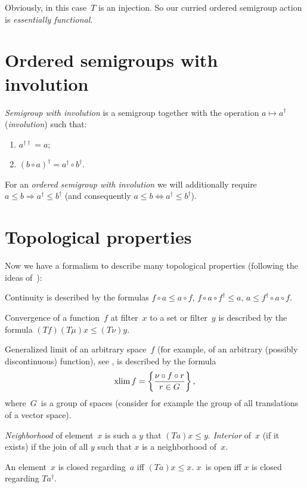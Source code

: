 Obviously, in this case~$T$ is an injection. So our curried ordered semigroup action is \emph{essentially functional}.

\section{Ordered semigroups with involution}

\begin{defn}
\emph{Semigroup with involution} is a semigroup together with the operation $a\mapsto a^{\dagger}$ (\emph{involution}) such that:
\begin{enumerate}
\item $a^{\dagger\dagger} = a$;
\item $(b\circ a)^{\dagger} = a^{\dagger}\circ b^{\dagger}$.
\end{enumerate}
\end{defn}

For an \emph{ordered semigroup with involution} we will additionally require $a\leq b\Rightarrow a^{\dagger}\leq b^{\dagger}$ (and consequently $a\leq b\Leftrightarrow a^{\dagger}\leq b^{\dagger}$).

\section{Topological properties}

Now we have a formalism to describe many topological properties (following the ideas of~\cite{volume-1}):

Continuity is described by the formulas $f\circ a\leq a\circ f$, $f\circ a\circ f^{\dagger}\leq a$, $a\leq f^{\dagger}\circ a\circ f$.

Convergence of a function~$f$ at filter~$x$ to a set or filter~$y$ is described by the formula $(Tf)(T\mu)x\leq(T\nu)y$.

Generalized limit of an arbitrary space~$f$ (for example, of an arbitrary (possibly discontinuous) function), see \cite{limit}, is described by the formula \[ \operatorname{xlim} f=\left\{ \frac{\nu\circ f\circ r}{r\in G}\right\}, \]
where~$G$~is a group of spaces (consider for example the group of all translations of a vector space).

\emph{Neighborhood} of element~$x$ is such a $y$ that $(Ta)x\leq y$. \emph{Interior} of~$x$ (if it exists) if the join of all $y$ such that $x$ is a neighborhood of~$x$.

An element~$x$ is closed regarding~$a$ iff $(Ta)x\leq x$. $x$~is open iff $x$ is closed regarding $Ta^{\dagger}$.

